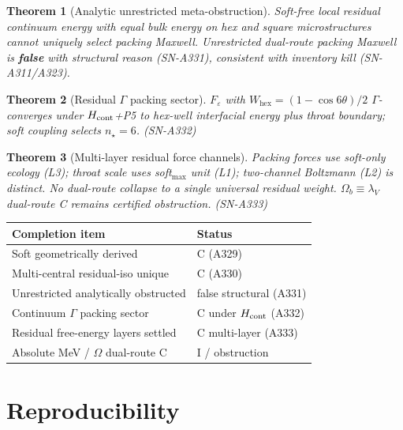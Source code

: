 \documentclass[11pt,a4paper]{article}
\newtheorem{theorem}{Theorem}
\theoremstyle{remark}
\begin{document}
\begin{theorem}[Analytic unrestricted meta-obstruction]
Soft-free local residual continuum energy with equal bulk energy on hex and square microstructures cannot uniquely select packing Maxwell. Unrestricted dual-route packing Maxwell is \textbf{false} with structural reason (SN-A331), consistent with inventory kill (SN-A311/A323).
\end{theorem}

\begin{theorem}[Residual $\Gamma$ packing sector]
$F_\varepsilon$ with $W_{\mathrm{hex}}=(1-\cos 6\theta)/2$ $\Gamma$-converges under $H_{\rm cont}$+P5 to hex-well interfacial energy plus throat boundary; soft coupling selects $n_\star=6$. (SN-A332)
\end{theorem}

\begin{theorem}[Multi-layer residual force channels]
Packing forces use soft-only ecology (L3); throat scale uses soft$_{\max}$ unit (L1); two-channel Boltzmann (L2) is distinct. No dual-route collapse to a single universal residual weight. $\Omega_b\equiv\lambda_V$ dual-route C remains certified obstruction. (SN-A333)
\end{theorem}

\begin{center}
\begin{tabular}{@{}p{5.6cm}p{5.8cm}@{}}
\toprule
Completion item & Status \\
\midrule
Soft geometrically derived & C (A329) \\
Multi-central residual-iso unique & C (A330) \\
Unrestricted analytically obstructed & false structural (A331) \\
Continuum $\Gamma$ packing sector & C under $H_{\rm cont}$ (A332) \\
Residual free-energy layers settled & C multi-layer (A333) \\
Absolute MeV / $\Omega$ dual-route C & I / obstruction \\
\bottomrule
\end{tabular}
\end{center}

\section{Reproducibility}
\label{sec:repro}
\end{document}
